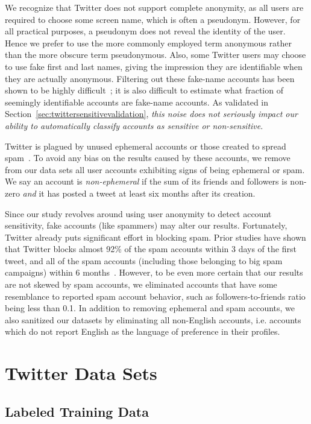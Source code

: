 \documentclass[conference]{IEEEtran}
\begin{document}
We recognize that Twitter does not support complete anonymity, as all users are required to choose some screen name, which is often a pseudonym. However, for all practical purposes, a pseudonym does not reveal the identity of the user. Hence we prefer to use the more commonly employed term anonymous rather than the more obscure term pseudonymous. Also, some Twitter users may choose to use fake first and last names, giving the impression they are identifiable when they are actually anonymous.  Filtering out these fake-name accounts has been shown to be highly difficult~\cite{boydFakenames2004}; it is also difficult to estimate what fraction of seemingly identifiable accounts are fake-name accounts.
As validated in Section~\ref{sec:twittersensitivevalidation}, {\em this noise does not seriously impact our ability to automatically classify accounts as sensitive or non-sensitive}. 

Twitter is plagued by unused ephemeral accounts or those created to spread spam~\cite{twitterspamcharacterization,twitterspamsuspendedaccounts}. 
To avoid any bias on the results caused by these accounts, we remove from our data sets all user accounts exhibiting signs of being ephemeral or spam. We say an account is {\em non-ephemeral} if the sum of its friends and followers is non-zero {\em and} it has posted a tweet at least six months after its creation.

Since our study revolves around using user anonymity to detect account sensitivity, 
fake accounts (like spammers) may alter our results.  Fortunately,
Twitter already puts significant effort in blocking spam.  Prior studies have shown that Twitter blocks almost 92\% of the spam accounts within 3 days of the first tweet, and all of the spam accounts (including those belonging to big spam campaigns) within 6 months~\cite{twitterspamsuspendedaccounts}. However, to be even more certain that our results are not skewed by spam accounts, we eliminated accounts that have some resemblance to reported spam account behavior, such as followers-to-friends ratio being less than 0.1. In addition to removing ephemeral and spam accounts, we also sanitized our datasets by eliminating all non-English accounts, i.e. accounts which do not report English as the language of preference in their profiles. 


\section{Twitter Data Sets}
\label{sec:twittersensitivedataset}
\subsection{Labeled Training Data}
\label{sec:twittersensitivetrainingdataset}
\end{document}
